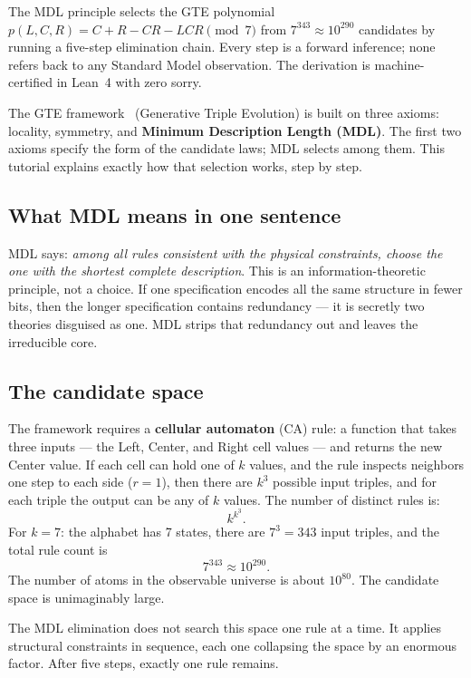 \documentclass[11pt,a4paper]{article}
\newcommand{\term}[1]{\textbf{#1}}
\theoremstyle{definition}
\begin{document}
\begin{tcolorbox}[colback=boxblue,colframe=blue!40!black,title=The one-line answer]
The MDL principle selects the GTE polynomial
$p(L,C,R) = C + R - CR - LCR \pmod 7$
from $7^{343} \approx 10^{290}$ candidates by running a five-step elimination
chain. Every step is a forward inference; none refers back to any Standard Model
observation. The derivation is machine-certified in Lean~4 with zero sorry.
\end{tcolorbox}

\bigskip
The GTE framework~\cite{SpivackGTECompleteFramework} (Generative Triple Evolution) is built on three axioms:
locality, symmetry, and \term{Minimum Description Length (MDL)}.
The first two axioms specify the form of the candidate laws; MDL selects
among them.
This tutorial explains exactly how that selection works, step by step.

\subsection{What MDL means in one sentence}

MDL says: \emph{among all rules consistent with the physical constraints,
choose the one with the shortest complete description}.  This is an
information-theoretic principle, not a choice.  If one specification
encodes all the same structure in fewer bits, then the longer specification
contains redundancy — it is secretly two theories disguised as one.  MDL
strips that redundancy out and leaves the irreducible core.

\subsection{The candidate space}

The framework requires a \term{cellular automaton} (CA) rule: a function
that takes three inputs — the Left, Center, and Right cell values — and
returns the new Center value.  If each cell can hold one of $k$ values, and
the rule inspects neighbors one step to each side ($r = 1$), then there are
$k^3$ possible input triples, and for each triple the output can be any of
$k$ values.  The number of distinct rules is:
\[
  k^{k^3}.
\]
For $k = 7$: the alphabet has 7 states, there are $7^3 = 343$ input triples,
and the total rule count is
\[
  7^{343} \approx 10^{290}.
\]
The number of atoms in the observable
universe is about $10^{80}$.  The candidate space is unimaginably large.

The MDL elimination does not search this space one rule at a time.
It applies structural constraints in sequence, each one collapsing the
space by an enormous factor.  After five steps, exactly one rule remains.
\end{document}
